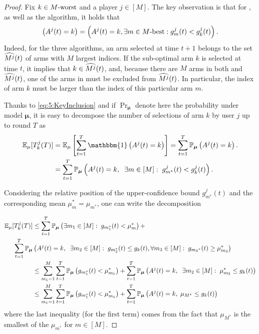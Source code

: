 \begin{proof}
  Fix $k\in M\text{-}\mathrm{worst}$ and a player $j \in [M]$.
  The key observation is that for \MCTopM, \RandTopM{} as well as the \rhoRand{} algorithm, it holds that
  \begin{equation}\left(A^j(t) = k\right) = \left(A^j(t) = k , \exists m \in M\text{-}\mathrm{best} : g_m^j(t) < g_k^j(t) \right).\label{eq:5:KeyInclusion}\end{equation}
  Indeed, for the three algorithms, an arm selected at time $t+1$ belongs to the set $\widehat{M^j}(t)$ of arms with $M$ largest indices.
  If the sub-optimal arm $k$ is selected at time $t$, it implies that $k \in \widehat{M^j}(t)$, and, because there are $M$ arms in both \Mbest{} and $\widehat{M^j}(t)$, one of the arms in \Mbest{} must be excluded from $\widehat{M^j}(t)$.
  In particular, the index of arm $k$ must be larger than the index of this particular arm $m$.

  Thanks to \eqref{eq:5:KeyInclusion} and if $\Pr_{\bm{\mu}} $ denote here the probability under model $\bm{\mu}$, it is easy to decompose the number of selections of arm $k$ by user $j$ up to round $T$ as
  \begin{align*}
  \E_{\mu}[T_k^j(T)]
  &= \E_{\mu}\left[ \sum_{t=1}^T \mathbbm{1}\left( A^j(t) = k \right) \right]
  = \sum_{t=1}^T \Pr_{\bm{\mu}} \left( A^j(t) = k \right).\\
  &= \sum_{t=1}^T \Pr_{\bm{\mu}} \left( A^j(t) = k,\;\; \exists m \in[M]:\; g_{m^*}^j(t) < g_k^j(t) \right).
  \end{align*}

  Considering the relative position of the upper-confidence bound $g_{m^*}^j(t)$ and the corresponding mean $\mu_m^* = \mu_{m^*}$, one can write the decomposition

  \begin{align}
    \mathbb{E}_{\mu}[T_k^j(T)] &\leq
    \sum_{t=1}^T\mathbb{P}_{\bm{\mu}} \left( \exists m_1 \in [M]: \; g_{m_1^*}(t) < \mu_m^* \right) + \notag \\
    \;\;\;\;
    \sum_{t=1}^T\mathbb{P}_{\bm{\mu}} & \left(A^j(t) = k,\;\; \exists m_2 \in [M]:\; g_{m_2^*}(t) \leq g_k(t) , \forall {m_3} \in [M]: \;  g_{{m_3}^*}(t) \geq \mu_{m_3}^* \right) \notag \\
    &\leq \sum_{m_1=1}^M\sum_{t=1}^T\mathbb{P}_{\bm{\mu}} \left(g_{m_1^*}(t) < \mu_{m_1}^* \right) + \sum_{t=1}^T\mathbb{P}_{\bm{\mu}} \left(A^j(t) = k,\;\; \exists m_2 \in [M]:\; \mu_{m_2}^* \leq g_k(t)\right) \notag \\
    & \leq \sum_{m_1=1}^M \sum_{t=1}^T \mathbb{P}_{\bm{\mu}} \left( g_{m_1^*}(t) < \mu_{m_1}^* \right)
    + \sum_{t=1}^T \mathbb{P}_{\bm{\mu}} \left( A^j(t) = k,\; \mu_{M^*} \leq g_k(t) \right)
    \label{eq:5:sumOfProbaForTkj}
  \end{align}
  where the last inequality (for the first term) comes from the fact that $\mu_{M^*}$ is the smallest of the $\mu_{m^*}$ for $m \in [M]$.


\end{proof}
